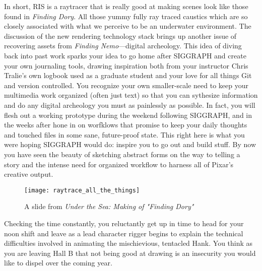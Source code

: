 \documentclass[../main.tex]{subfiles}
\begin{document}
In short, RIS is a raytracer that is really good at making scenes look like those found in \textit{Finding Dory}. All those yummy fully ray traced caustics which are so closely associated with what we perceive to be an underwater environment. The discussion of the new rendering technology stack brings up another issue of recovering assets from \textit{Finding Nemo}---digital archeology. This idea of diving back into past work sparks your idea to go home after SIGGRAPH and create your own journaling tools, drawing inspiration both from your instructor Chris Tralie's own logbook used as a graduate student and your love for all things Git and version controlled. You recognize your own smaller-scale need to keep your multimedia work organized (often just text) so that you can sythesize information and do any digital archeology you must as painlessly as possible. In fact, you will flesh out a working prototype during the weekend following SIGGRAPH, and in the weeks after hone in on worfklows that promise to keep your daily thoughts and touched files in some sane, future-proof state. This right here is what you were hoping SIGGRAPH would do: inspire you to go out and build stuff. By now you have seen the beauty of sketching abstract forms on the way to telling a story and the intense need for organized workflow to harness all of Pixar's creative output.

\begin{figure}[h!]
	\centering
	\texttt{[image: raytrace\_all\_the\_things]}
	\caption*{A slide from \textit{Under the Sea: Making of "Finding Dory"}}
\end{figure}

Checking the time constantly, you reluctantly get up in time to head for your noon shift and leave as a lead character rigger begins to explain the technical difficulties involved in animating the mischievious, tentacled Hank. You think as you are leaving Hall B that not being good at drawing is an insecurity you would like to dispel over the coming year.
\end{document}
